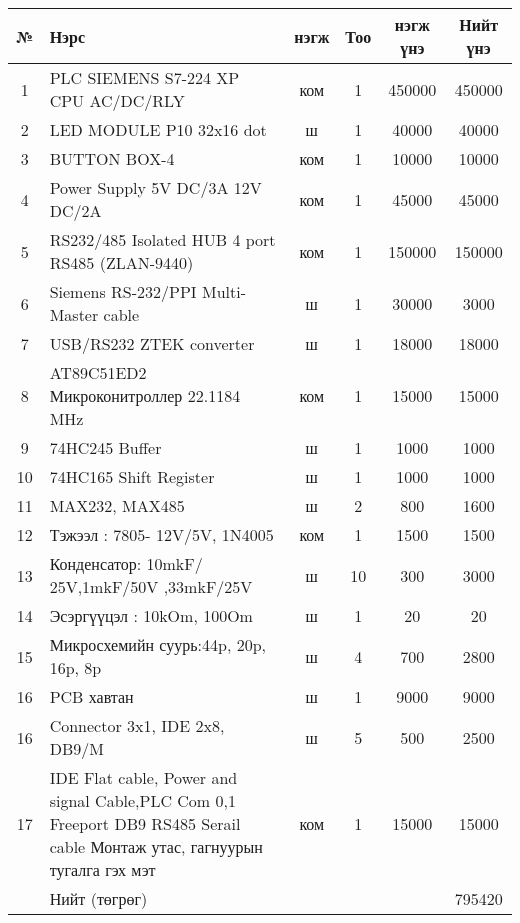 \begin{tabular}[b]{|c|p{6 cm}|c|c|c|c|}
	\hline
№  & Нэрс & нэгж & Тоо & нэгж үнэ & Нийт үнэ \\ \hline
1  & PLC SIEMENS S7-224 XP CPU AC/DC/RLY & ком & 1 & 450000 & 450000 \\ \hline
2  & LED MODULE  P10  32x16 dot  & ш & 1 & 40000 & 40000 \\ \hline
3  & BUTTON BOX-4 & ком & 1 & 10000 & 10000 \\ \hline
4  & Power Supply 5V DC/3A 12V DC/2A & ком & 1 & 45000 & 45000 \\ \hline
5  & RS232/485  Isolated HUB 4 port RS485 (ZLAN-9440) & ком & 1 & 150000 & 150000 \\ \hline
6  & Siemens  RS-232/PPI Multi-Master cable & ш & 1 & 30000 & 3000 \\ \hline
7  & USB/RS232 ZTEK converter & ш & 1 & 18000 & 18000 \\ \hline
8  & AT89C51ED2   Микроконитроллер 22.1184 MHz & ком & 1 & 15000 & 15000 \\ \hline
9  & 74HC245 Buffer & ш & 1 & 1000 & 1000 \\ \hline
10  & 74HC165  Shift Register & ш & 1 & 1000 & 1000 \\ \hline
11  & MAX232, MAX485 & ш & 2 & 800 & 1600 \\ \hline
12  & Тэжээл : 7805-  12V/5V,  1N4005 & ком & 1 & 1500 & 1500 \\ \hline
13  & Конденсатор:  10mkF/ 25V,1mkF/50V  ,33mkF/25V & ш & 10 & 300 & 3000 \\ \hline
14  & Эсэргүүцэл : 10kOm, 100Om & ш & 1 & 20 & 20 \\ \hline
15  & Микросхемийн суурь:44p, 20p, 16p, 8p & ш & 4 & 700 & 2800 \\ \hline
16  & PCB хавтан  & ш & 1 & 9000 & 9000 \\ \hline
16  & Connector 3x1, IDE 2x8,  DB9/M & ш & 5 & 500 & 2500 \\ \hline
17  & IDE Flat cable, Power and signal Cable,PLC Com 0,1 Freeport DB9 RS485 Serail cable Монтаж утас, гагнуурын тугалга гэх мэт & ком & 1 & 15000 & 15000 \\ \hline
  &          Нийт  (төгрөг)  &  &  &  & 795420 \\ \hline
\end{tabular}
